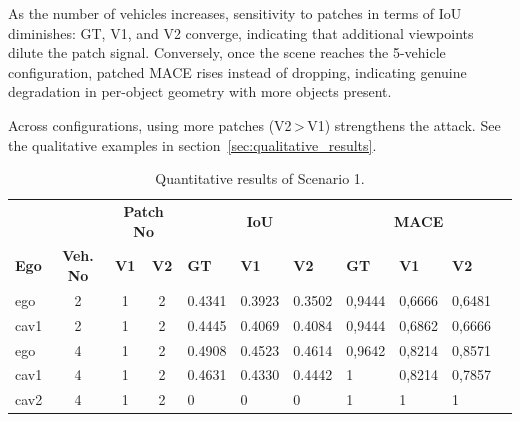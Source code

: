 As the number of vehicles increases, sensitivity to patches in terms of IoU diminishes: GT, V1, and V2 converge, indicating that additional viewpoints dilute the patch signal.
Conversely, once the scene reaches the 5-vehicle configuration, patched MACE rises instead of dropping, indicating genuine degradation in per-object geometry with more objects present.

Across configurations, using more patches (V2\,>\,V1) strengthens the attack.
See the qualitative examples in section~\ref{sec:qualitative_results}.

\begin{table}[tph]
    \caption{Quantitative results of Scenario 1.}
    \label{tab:scenario1_results}
    \begin{tabularx}{\textwidth}{l c c c *{7}{X}}
        \toprule
                         &             & \multicolumn{2}{c}{\textbf{Patch No}} & \multicolumn{3}{c}{\textbf{IoU}} & \multicolumn{3}{c}{\textbf{MACE}}                                               \\
        \cmidrule(lr){5-7}\cmidrule(lr){8-10}
        \textbf{Ego}     &
        \textbf{Veh. No} & \textbf{V1} & \textbf{V2}                           &
        \textbf{GT}      & \textbf{V1} & \textbf{V2}                           &
        \textbf{GT}      & \textbf{V1} & \textbf{V2}                                                                                                                                                \\
        \midrule %
        ego              & 2           & 1                                     & 2                                & 0.4341                            & 0.3923 & 0.3502 & 0,9444 & 0,6666  & 0,6481 \\
        cav1             & 2           & 1                                     & 2                                & 0.4445                            & 0.4069 & 0.4084 & 0,9444 & 0,6862  & 0,6666 \\
        \midrule
        ego              & 4           & 1                                     & 2                                & 0.4908                            & 0.4523 & 0.4614 & 0,9642 & 0,8214  & 0,8571 \\
        cav1             & 4           & 1                                     & 2                                & 0.4631                            & 0.4330 & 0.4442 & 1      & 0,8214  & 0,7857 \\
        cav2             & 4           & 1                                     & 2                                & 0                                 & 0      & 0      & 1      & 1       & 1      \\

\end{tabularx}
\end{table}
